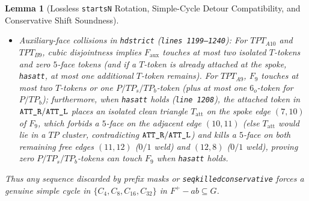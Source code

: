 \documentclass[11pt,reqno]{amsart}
\theoremstyle{plain}
\newtheorem{lemma}[theorem]{Lemma}
\theoremstyle{definition}
\theoremstyle{remark}
\DeclareRobustCommand{\_}{\ifmmode\text{\textunderscore}\else\textunderscore\allowbreak\fi}
\begin{document}
\begin{lemma}[Lossless \texttt{starts\_N} Rotation, Simple-Cycle Detour Compatibility, and Conservative Shift Soundness]
\begin{enumerate}[label=(\roman*),leftmargin=2.2em]
\begin{itemize}[leftmargin=1.5em]
\begin{itemize}[leftmargin=1.4em]
    \end{itemize}
    \item \emph{Auxiliary-face collisions in \texttt{hd\_strict} (\texttt{lines 1199--1240}):} For $TPT_{A10}$ and $TPT_{B9}$, cubic disjointness implies $F_{\mathrm{aux}}$ touches at most two isolated $T$-tokens and zero $5$-face tokens (and if a $T$-token is already attached at the spoke, \texttt{has\_att}, at most one additional $T$-token remains). For $TPT_{A9}$, $F_9$ touches at most two $T$-tokens or one $P/TP_s/TP_b$-token (plus at most one $6_o$-token for $P/TP_b$); furthermore, when \texttt{has\_att} holds (\texttt{line 1208}), the attached token in $\texttt{ATT\_R}/\texttt{ATT\_L}$ places an \emph{isolated} clean triangle $T_{\mathrm{att}}$ on the spoke edge $(7, 10)$ of $F_9$, which forbids a $5$-face on the adjacent edge $(10, 11)$ (else $T_{\mathrm{att}}$ would lie in a $TP$ cluster, contradicting $\texttt{ATT\_R}/\texttt{ATT\_L}$) and kills a $5$-face on both remaining free edges $(11, 12)$ ($0/1$ weld) and $(12, 8)$ ($0/1$ weld), proving zero $P/TP_s/TP_b$-tokens can touch $F_9$ when \texttt{has\_att} holds.
  \end{itemize}
  Thus any sequence discarded by prefix masks or \texttt{seq\_killed\_conservative} forces a genuine simple cycle in $\{C_4, C_8, C_{16}, C_{32}\}$ in $F^+ - ab \subseteq G$.
\end{enumerate}
\end{lemma}
\end{document}
